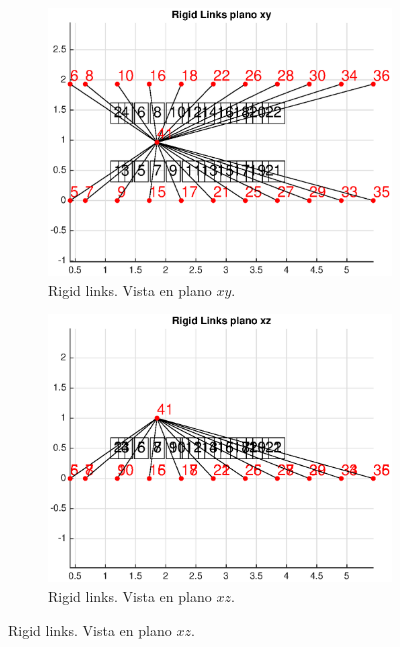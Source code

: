 \documentclass[onecolumn,10pt,titlepage,a4paper]{article}
\begin{document}
\begin{figure}[htb!]
	\centering
	\begin{subfigure}{0.49\textwidth}
		\includegraphics[width=\linewidth]{fig/modelRLxy.eps}
		\caption{Rigid links. Vista en plano $x\!y$.}
		\label{fig:modeloRLxy}
	\end{subfigure}
	\begin{subfigure}{0.49\textwidth}
		\includegraphics[width=\linewidth]{fig/modelRLxz.eps}
		\caption{Rigid links. Vista en plano $x\!z$.}
		\label{fig:modeloRLxz}
	\end{subfigure}
\end{figure}
\end{document}
